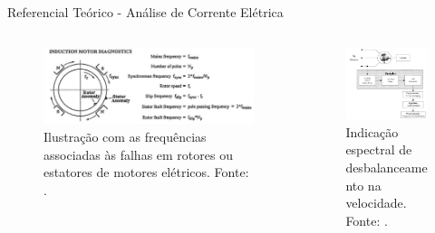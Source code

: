 \documentclass[aspectratio=169]{beamer}
\begin{document}
\begin{frame}{Referencial Teórico - Análise de Corrente Elétrica}
	\begin{columns}
    	\begin{column}{0.50\textwidth}
			\begin{figure}[HT]
				\begin{center}
					\includegraphics[scale=.18]{../referencial/img/fault_freq_randall_p55.png}
					\caption{Ilustração com as frequências associadas às falhas em rotores ou estatores de motores elétricos. \newline
					Fonte: .} 
					\label{fig:fault_freq_randall_p55}
				\end{center}
			\end{figure}
     	\end{column}
		
		\begin{column}{0.5\textwidth}
			\begin{figure}[HT]
				\begin{center}
					\includegraphics[scale=.3]{../referencial/img/current_benbouzid_p3.png}
					\caption{Indicação espectral de desbalanceamento na velocidade. \newline
					Fonte: .} 
					\label{fig:current_benbouzid_p3}
				\end{center}
			\end{figure}
	 	\end{column}
	 \end{columns}
\end{frame}
\end{document}
